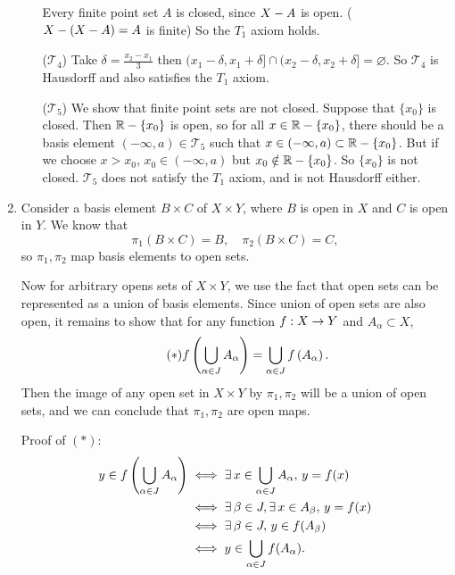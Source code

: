 \documentclass[12pt]{report}
\newcommand{\prob}[1]{\item[\large\textbf{\sffamily #1.}]}
\newcommand{\T}{\mathcal{T}}
\begin{document}
\begin{enumerate}
\begin{enumerate}
        Every finite point set \(A\) is closed, since \(X - A\) is open. (\(X - \left( X - A \right) = A\) is finite) So the \(T_1\) axiom holds.

        \medskip

        (\(\T_4\)) Take \(\delta = \frac{x_2 - x_1}{3}\) then \((x_1 - \delta, x_1 + \delta] \cap (x_2 - \delta, x_2 + \delta] = \varnothing\). So \(\T_4\) is Hausdorff and also satisfies the \(T_1\) axiom.

        \medskip

        (\(\T_5\)) We show that finite point sets are not closed. Suppose that \(\{x_0\}\) is closed. Then \(\mathbb{R} - \{x_0\}\) is open, so for all \(x \in \mathbb{R} - \{x_0\}\), there should be a basis element \((-\infty, a) \in \T_5\) such that \(x \in (-\infty, a) \subset \mathbb{R} - \{x_0\}\). But if we choose \(x > x_0\), \(x_0 \in (-\infty, a)\) but \(x_0 \notin \mathbb{R}- \{x_0\}\). So \(\{x_0\}\) is not closed. \(\T_5\) does not satisfy the \(T_1\) axiom, and is not Hausdorff either.
    \end{enumerate}

    \prob{3} Consider a basis element \(B \times C\) of \(X \times Y\), where \(B\) is open in \(X\) and \(C\) is open in \(Y\). We know that
    \[
        \pi_1(B\times C) = B, \quad \pi_2(B\times C) = C,
    \]
    so \(\pi_1, \pi_2\) map basis elements to open sets.

    Now for arbitrary opens sets of \(X \times Y\), we use the fact that open sets can be represented as a union of basis elements. Since union of open sets are also open, it remains to show that for any function \(f : X \rightarrow Y\) and \(A_\alpha \subset X\),
    \[\tag{\(\ast\)}
        f\left( \bigcup_{\alpha \in J} A_\alpha \right) = \bigcup_{\alpha \in J} f\left( A_\alpha \right).
    \]
    Then the image of any open set in \(X \times Y\) by \(\pi_1, \pi_2\) will be a union of open sets, and we can conclude that \(\pi_1, \pi_2\) are open maps.

    Proof of \((\ast)\):
    \[
        \begin{aligned}
            y \in f\paren{\bigcup_{\alpha \in J} A_\alpha} & \iff \exists x \in \bigcup_{\alpha \in J} A_\alpha,\, y = f(x) \\
                                                           & \iff \exists \beta\in J, \exists x \in A_\beta, \, y = f(x)    \\
                                                           & \iff \exists \beta \in J,\,  y \in f(A_\beta)                  \\
                                                           & \iff y \in \bigcup_{\alpha \in J} f(A_\alpha).
        \end{aligned}
    \]


\end{enumerate}
\end{document}

